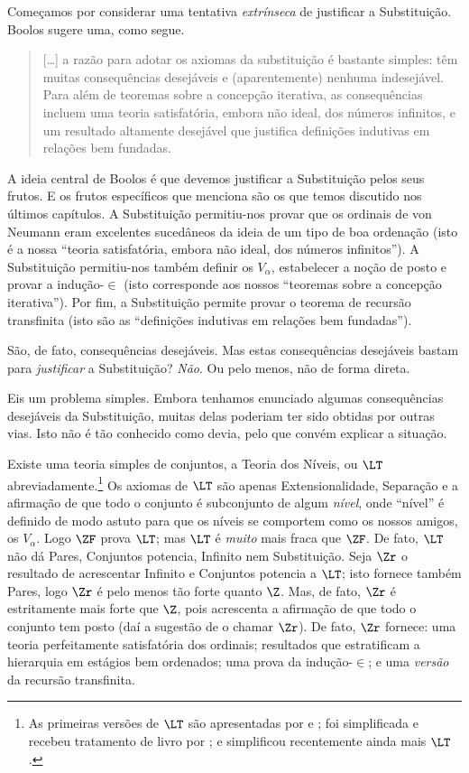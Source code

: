 \documentclass[../../../include/open-logic-section]{subfiles}
\begin{document}

Começamos por considerar uma tentativa \emph{extrínseca} de justificar a
Substituição. Boolos sugere uma, como segue. 
\begin{quote}
  [\ldots] a razão para adotar os axiomas da substituição é bastante
  simples: têm muitas consequências desejáveis e (aparentemente) nenhuma
  indesejável. Para além de teoremas sobre a concepção iterativa,
  as consequências incluem uma teoria satisfatória, embora não ideal,
  dos números infinitos, e um resultado altamente desejável que
  justifica definições indutivas em relações bem fundadas.
  \citep[229]{Boolos1971}
\end{quote}		
A ideia central de Boolos é que devemos justificar a Substituição pelos seus
frutos. E os frutos específicos que menciona são os que temos
discutido nos últimos capítulos. A Substituição permitiu-nos provar
que os ordinais de von Neumann eram excelentes sucedâneos da ideia
de um tipo de boa ordenação (isto é a nossa ``teoria satisfatória, embora não ideal,
dos números infinitos''). A Substituição permitiu-nos também definir
os $V_\alpha$, estabelecer a noção de posto e provar a
indução-$\in$ (isto corresponde aos nossos ``teoremas sobre a concepção
iterativa''). Por fim, a Substituição permite provar o teorema de recursão transfinita (isto são as ``definições indutivas em relações bem
fundadas''). 

São, de fato, consequências desejáveis. Mas estas consequências desejáveis
bastam para \emph{justificar} a Substituição? \emph{Não}. Ou pelo
menos, não de forma direta. 

Eis um problema simples. Embora tenhamos enunciado algumas consequências desejáveis da Substituição, muitas delas poderiam ter sido obtidas por
outras vias. Isto não é tão conhecido como devia, pelo que convém explicar a situação. 

Existe uma teoria simples de conjuntos, a Teoria dos Níveis, ou $\LT$ abreviadamente.\footnote{As primeiras versões de $\LT$ são apresentadas por \citet{Montague1965} e \citet{Scott1974}; foi simplificada e recebeu tratamento de livro por \citet{Potter2004}; e \citet{ButtonLT1} simplificou recentemente ainda mais $\LT$.} Os axiomas de $\LT$ são apenas Extensionalidade, Separação e a afirmação de que todo o conjunto é subconjunto de algum \emph{nível}, onde ``nível'' é definido de modo astuto para que os níveis se comportem como os nossos amigos, os $V_\alpha$. Logo $\ZF$ prova $\LT$; mas $\LT$ é \emph{muito} mais fraca que $\ZF$. De fato, $\LT$ não dá Pares, Conjuntos potencia, Infinito nem Substituição. Seja $\Zr$ o resultado de acrescentar Infinito e Conjuntos potencia a $\LT$; isto fornece também Pares, logo $\Zr$ é pelo menos tão forte quanto $\Z$. Mas, de fato, $\Zr$ é estritamente mais forte que $\Z$, pois acrescenta a afirmação de que todo o conjunto tem posto (daí a sugestão de o chamar $\Zr$). De fato, $\Zr$ fornece: uma teoria perfeitamente satisfatória dos ordinais;
resultados que estratificam a hierarquia em estágios bem ordenados; uma prova
da indução-$\in$; e uma \emph{versão} da recursão transfinita. 
\end{document}
